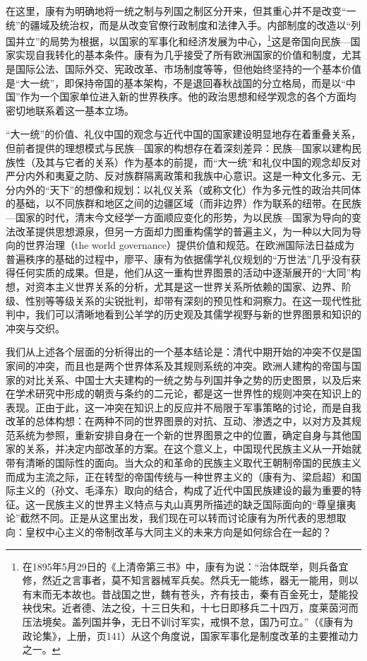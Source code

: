 \documentclass[a4paper, 12pt, openright]{ctexbook}
\begin{document}
在这里，康有为明确地将一统之制与列国之制区分开来，但其重心并不是改变“一统”的疆域及统治权，而是从改变官僚行政制度和法律入手。内部制度的改造以“列国并立”的局势为根据，以国家的军事化和经济发展为中心，\footnote{在1895年5月29日的《上清帝第三书》中，康有为说：“治体既举，则兵备宜修，然近之言事者，莫不知言器械军兵矣。然兵无一能练，器无一能用，则以有末而无本故也。昔战国之世，魏有苍头，齐有技击，秦有百金死士，楚能投袂伐宋。近者德、法之役，十三日失和，十七日即移兵二十四万，度莱茵河而压法境矣。盖列国并争，无日不训讨军实，戒惧不怠，国乃可立。”（《康有为政论集》，上册，页141）从这个角度说，国家军事化是制度改革的主要推动力之一。}这是帝国向民族—国家实现自我转化的基本条件。康有为几乎接受了所有欧洲国家的价值和制度，尤其是国际公法、国际外交、宪政改革、市场制度等等，但他始终坚持的一个基本价值是“大一统”，即保持帝国的基本架构，不是退回春秋战国的分立格局，而是以“中国”作为一个国家单位进入新的世界秩序。他的政治思想和经学观念的各个方面均密切地联系着这一基本立场。

“大一统”的价值、礼仪中国的观念与近代中国的国家建设明显地存在着重叠关系，但前者提供的理想模式与民族—国家的构想存在着深刻差异：民族—国家以建构民族性（及其与它者的关系）作为基本的前提，而“大一统”和礼仪中国的观念却反对严分内外和夷夏之防、反对族群隔离政策和我族中心意识。这是一种文化多元、无分内外的“天下”的想像和规划：以礼仪关系（或称文化）作为多元性的政治共同体的基础，以不同族群和地区之间的边疆区域（而非边界）作为联系的纽带。在民族—国家的时代，清末今文经学一方面顺应变化的形势，为以民族—国家为导向的变法改革提供思想源泉，但另一方面却力图重构儒学的普遍主义，为一种以大同为导向的世界治理（the world governance）提供价值和规范。在欧洲国际法日益成为普遍秩序的基础的过程中，廖平、康有为依据儒学礼仪规划的“万世法”几乎没有获得任何实质的成果。但是，他们从这一重构世界图景的活动中逐渐展开的“大同”构想，对资本主义世界关系的分析，尤其是这一世界关系所依赖的国家、边界、阶级、性别等等级关系的尖锐批判，却带有深刻的预见性和洞察力。在这一现代性批判中，我们可以清晰地看到公羊学的历史观及其儒学视野与新的世界图景和知识的冲突与交织。

我们从上述各个层面的分析得出的一个基本结论是：清代中期开始的冲突不仅是国家间的冲突，而且也是两个世界体系及其规则系统的冲突。欧洲人建构的帝国与国家的对比关系、中国士大夫建构的一统之势与列国并争之势的历史图景，以及后来在学术研究中形成的朝贡与条约的二元论，都是这一世界性的规则冲突在知识上的表现。正由于此，这一冲突在知识上的反应并不局限于军事策略的讨论，而是自我改革的总体构想：在两种不同的世界图景的对抗、互动、渗透之中，以对方及其规范系统为参照，重新安排自身在一个新的世界图景之中的位置，确定自身与其他国家的关系，并决定内部改革的方案。在这个意义上，中国现代民族主义从一开始就带有清晰的国际性的面向。当大众的和革命的民族主义取代王朝制帝国的民族主义而成为主流之际，正在转型的帝国传统与一种世界主义的（康有为、梁启超）和国际主义的（孙文、毛泽东）取向的结合，构成了近代中国民族建设的最为重要的特征。这一民族主义的世界主义特点与丸山真男所描述的缺乏国际面向的“尊皇攘夷论”截然不同。正是从这里出发，我们现在可以转而讨论康有为所代表的思想取向：皇权中心主义的帝制改革与大同主义的未来方向是如何综合在一起的？
\end{document}
